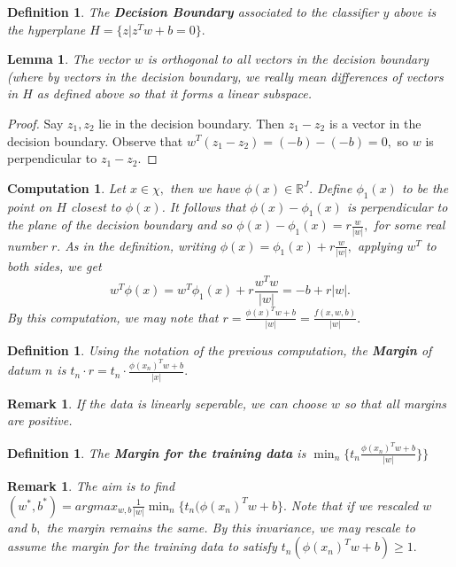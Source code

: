 \documentclass{amsart}
\newtheorem{lem}[subsubsection]{Lemma}
\newtheorem{comp}[subsubsection]{Computation}
\newtheorem{defn}[subsubsection]{Definition}
\newtheorem{rem}[subsubsection]{Remark}
\begin{document}
\begin{defn}
The {\bf Decision Boundary} associated to the classifier $y$ above is the hyperplane $H=\{z|z^Tw +b =0\}.$
\end{defn}

\begin{lem}
The vector $w$ is orthogonal to all vectors in the decision boundary (where by vectors in the decision boundary, we really mean differences of vectors in $H$ as defined above so that it forms a linear subspace.
\end{lem}
\begin{proof}
Say $z_1, z_2$ lie in the decision boundary. Then $z_1 -z_2$ is a vector in the decision boundary. Observe that $w^T(z_1 - z_2)= (-b)-(-b) = 0,$ so $w$ is perpendicular to $z_1-z_2.$
\end{proof}

\begin{comp}
Let $x \in \chi,$ then we have $\phi(x) \in \mathbb R^J.$ Define $\phi_1(x)$ to be the point on $H$ closest to $\phi(x)$. It follows that $\phi(x) - \phi_1(x)$ is perpendicular to the plane of the decision boundary and so $\phi(x) - \phi_1(x) = r \frac w {|w|},$ for some real number $r.$
As in the definition, writing $\phi(x) = \phi_1(x) + r \frac  w {|w|},$ applying $w^T$ to both sides, we get
$$ w^T \phi(x) = w^T\phi_1(x) + r \frac {w^Tw}{|w|} = -b + r |w|.$$
By this computation, we may note that $r = \frac {\phi(x)^Tw+b}{|w|} = \frac {f(x,w,b)}{|w|}.$
\end{comp}

\begin{defn}
Using the notation of the previous computation, the {\bf Margin} of datum $n$ is $t_n \cdot r = t_n \cdot \frac {\phi(x_n)^Tw+b}{|x|}.$
\end{defn}

\begin{rem}
If the data is linearly seperable, we can choose $w$ so that all margins are positive.
\end{rem}

\begin{defn}
The {\bf Margin for the training data} is $\min_n\{ t_n \frac {\phi(x_n)^T w + b}{|w|}\}\}$
\end{defn}

\begin{rem}
The aim is to find $(w^*,b^*) = argmax_{w,b} \frac 1 {|w|} \min_n \{t_n(\phi(x_n)^T w +b \}.$ Note that if we rescaled $w$ and $b,$ the margin remains the same. By this invariance, we may rescale to assume the margin for the training data to satisfy $t_n(\phi(x_n)^Tw+b) \geq 1.$ 
\end{rem}
\end{document}
